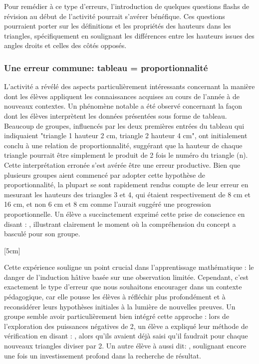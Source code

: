 Pour remédier à ce type d'erreurs,
l'introduction de quelques questions flashs de révision au début de l'activité pourrait s'avérer bénéfique.
Ces questions pourraient porter sur les définitions et les propriétés des hauteurs dans les triangles,
spécifiquement en soulignant les différences entre les hauteurs issues des angles droits et celles des côtés opposés.

\subsubsection{Une erreur commune: tableau = proportionnalité}

L'activité a révélé des aspects particulièrement intéressants concernant la manière dont les élèves appliquent les connaissances acquises au cours de l'année à de nouveaux contextes.
Un phénomène notable a été observé concernant la façon dont les élèves interprètent les données présentées sous forme de tableau.
Beaucoup de groupes,
influencés par les deux premières entrées du tableau qui indiquaient "triangle 1 hauteur 2 cm, triangle 2 hauteur 4 cm",
ont initialement conclu à une relation de proportionnalité,
suggérant que la hauteur de chaque triangle pourrait être simplement le produit de 2 fois le numéro du triangle (n).\\

Cette interprétation erronée s'est avérée être une erreur productive.
Bien que plusieurs groupes aient commencé par adopter cette hypothèse de proportionnalité,
la plupart se sont rapidement rendus compte de leur erreur en mesurant les hauteurs des triangles 3 et 4,
qui étaient respectivement de 8 cm et 16 cm,
et non 6 cm et 8 cm comme l'aurait suggéré une progression proportionnelle.
Un élève a succinctement exprimé cette prise de conscience en disant :
,
illustrant clairement le moment où la compréhension du concept a basculé pour son groupe.

[5cm]

Cette expérience souligne un point crucial dans l'apprentissage mathématique :
le danger de l'induction hâtive basée sur une observation limitée.
Cependant,
c'est exactement le type d'erreur que nous souhaitons encourager dans un contexte pédagogique,
car elle pousse les élèves à réfléchir plus profondément et à reconsidérer leurs hypothèses initiales à la lumière de nouvelles preuves.
Un groupe semble avoir particulièrement bien intégré cette approche :
lors de l'exploration des puissances négatives de 2,
un élève a expliqué leur méthode de vérification en disant :
,
alors qu'ils avaient déjà saisi qu'il faudrait pour chaque nouveaux triangles diviser par 2.
Un autre élève à aussi dit: ,
soulignant encore une fois un investissement profond dans la recherche de résultat.

